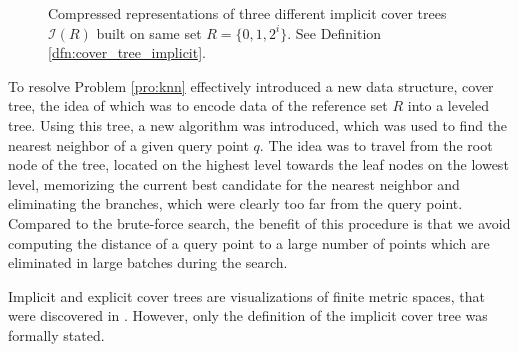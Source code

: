 \documentclass{vgtc}                          %
\numberwithin{algocf}{section}
\theoremstyle{definition}
\theoremstyle{definition}
\theoremstyle{definition}
\theoremstyle{plain}
\newcommand{\I}{\mathcal{I}}
\begin{document}
\begin{figure}
\centering
   \begin{subfigure}{.30\textwidth}
  \centering
  
  \label{fig:cover_tree_variant_one}

\end{subfigure}
\begin{subfigure}{.30\textwidth}
  \label{fig:cover_tree_variant_two}
  \centering
  
\end{subfigure}
\begin{subfigure}{.30\textwidth}
  \centering
  
  \label{fig:cover_tree_variant_three}
\end{subfigure}
\caption{%
Compressed representations of three different implicit cover trees $\I(R)$ built on same set $R = \{0,1,2^{i}\}$.
See Definition \ref{dfn:cover_tree_implicit}.
}
\label{fig:cover_tree_easy_example}
\end{figure}

To resolve Problem \ref{pro:knn} effectively \cite{beygelzimer2006cover} introduced a new data structure, cover tree, the idea of which was to encode data of the reference set $R$ into a leveled tree. Using this tree, a new algorithm \cite[Algorithm~1]{beygelzimer2006cover} was introduced, which was used to find the nearest neighbor of a given query point $q$. The idea was to travel from the root node of the tree, located on the highest level towards the leaf nodes on the lowest level, memorizing the current best candidate for the nearest neighbor and eliminating the branches, which were clearly too far from the query point. Compared to the brute-force search, the benefit of this procedure is that we avoid computing the distance of a query point to a large number of points which are eliminated in large batches during the search.

\medskip

\noindent
Implicit and explicit cover trees are visualizations of finite metric spaces, that were discovered in \cite[Section~2]{beygelzimer2006cover}. However, only the definition of the implicit cover tree was formally stated.
\end{document}
